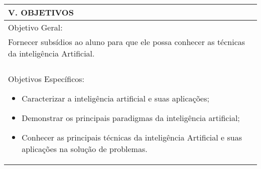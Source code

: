 \documentclass[12pt]{article}
\begin{document}
\begin{longtable}{|L{1.025\textwidth}|} \hline
%
{\bf V. OBJETIVOS } \\ \hline
%
Objetivo Geral:\\

Fornecer subsídios ao aluno para que ele possa conhecer as técnicas da inteligência Artificial.\\
\\
Objetivos Específicos:
\begin{itemize}  
\item Caracterizar a inteligência artificial e suas aplicações;
\item Demonstrar os principais paradigmas da inteligência artificial;
\item Conhecer as principais técnicas da inteligência Artificial e suas aplicações na solução de problemas.
\end{itemize}

\\ \hline
\end{longtable}
\end{document}
